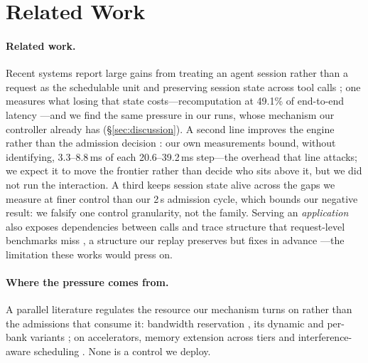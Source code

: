 \section{Related Work}
\label{sec:related}

\paragraph{Related work.} Recent systems report large gains from treating an agent session rather than a request as the schedulable unit and preserving session state across tool calls
\cite{talaria,continuum,thunderagent,concur,mori}; one measures what losing that state costs---recomputation at 49.1\% of end-to-end latency \cite{concur}---and we find the same pressure in our runs, whose mechanism our controller already has (\S\ref{sec:discussion}). A second line improves
the engine rather than the admission decision
\cite{yu2022orca,kwon2023pagedattention,sarathi,distserve,mooncake,flashattention,splitwise}: our
own measurements bound, without identifying, 3.3--8.8\,ms of each
20.6--39.2\,ms step---the overhead that line
attacks; we expect it to move the frontier rather than decide who sits above it,
but we did not run the interaction. A third keeps session state alive across the
gaps we measure
\cite{yu2025pensieve,gao2024cachedattention,sun2024llumnix,wu2026fastserve} at
finer control than our 2\,s admission cycle, which bounds our negative result: we
falsify one control granularity, not the family. Serving an \emph{application}
also exposes dependencies between calls \cite{lin2024parrot}
and trace structure that request-level benchmarks miss \cite{wang2026xperf},
a structure our replay preserves but fixes in advance \cite{genprofiling}---the
limitation these works would press on.

\paragraph{Where the pressure comes from.} A parallel literature regulates the
resource our mechanism turns on rather than the admissions that consume it:
bandwidth reservation \cite{memguard,yun2016,mempol}, its dynamic and per-bank
variants \cite{dynamo,perbank24,etm2,perbank26}; on accelerators, memory extension
across tiers \cite{rtswap,zerowsap} and interference-aware scheduling
\cite{xiang2019,tpdnndpu,aiheat}. None is a control we deploy.

